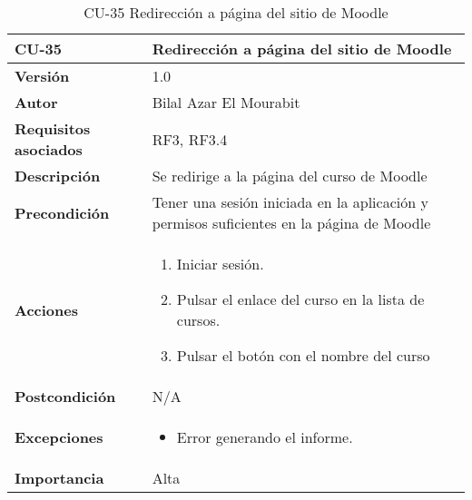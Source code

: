 \begin{table}[H]
	\centering
	\begin{tabularx}{\linewidth}{ p{} p{} }
		\toprule
		\textbf{CU-35}    & \textbf{Redirección a página del sitio de Moodle}\\
		\toprule
		\textbf{Versión}              & 1.0    \\
		\textbf{Autor}                & Bilal Azar El Mourabit \\
		\textbf{Requisitos asociados} & RF3, RF3.4\\
		\textbf{Descripción}          & Se redirige a la página del curso de Moodle\\
    		\textbf{Precondición}         & Tener una sesión iniciada en la aplicación y permisos suficientes en la página de Moodle\\
		\textbf{Acciones}             & 
		\begin{enumerate}
			\def\labelenumi{\arabic{enumi}.}
			\tightlist
			\item Iniciar sesión.
            \item Pulsar el enlace del curso en la lista de cursos.
            \item Pulsar el botón con el nombre del curso
		\end{enumerate}\\
		\textbf{Postcondición}        & N/A \\
		\textbf{Excepciones}          & \begin{itemize}
		    \item Error generando el informe.
		\end{itemize} \\
		\textbf{Importancia}          & Alta \\
		\bottomrule
	\end{tabularx}
	\caption{CU-35 Redirección a página del sitio de Moodle}
\end{table}

